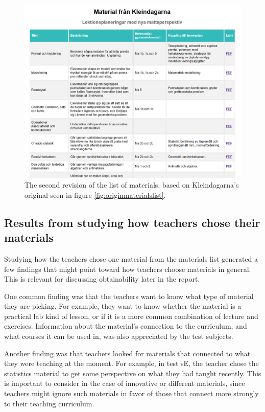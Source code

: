 \begin{figure}[H]
\centering
\includegraphics[width=\linewidth]{figure/screenshot_materiallista_revision_2.png}
  \caption{The second revision of the list of materials, based on Kleindagarna's original seen in figure \ref{fig:originmaterialslist}.}
  \label{fig:revmaterialslist}
\end{figure}

\subsection{Results from studying how teachers chose their materials} \label{pickmaterials}

Studying how the teachers chose one material from the materials list generated a few findings that might point toward how teachers choose materials in general. This is relevant for discussing obtainability later in the report.

One common finding was that the teachers want to know what type of material they are picking. For example, they want to know whether the material is a practical lab kind of lesson, or if it is a more common combination of lecture and exercises. Information about the material's connection to the curriculum, and what courses it can be used in, was also appreciated by the test subjects.

Another finding was that teachers looked for materials that connected to what they were teaching at the moment. For example, in test sE, the teacher chose the statistics material to get some perspective on what they had taught recently. This is important to consider in the case of innovative or different materials, since teachers might ignore such materials in favor of those that connect more strongly to their teaching curriculum.

